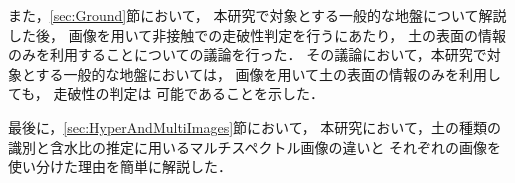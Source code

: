 また，\ref{sec:Ground}節において，
本研究で対象とする一般的な地盤について解説した後，
画像を用いて非接触での走破性判定を行うにあたり，
土の表面の情報のみを利用することについての議論を行った．
その議論において，本研究で対象とする一般的な地盤においては，
画像を用いて土の表面の情報のみを利用しても，
走破性の判定は
可能であることを示した．

最後に，\ref{sec:HyperAndMultiImages}節において，
本研究において，土の種類の識別と含水比の推定に用いるマルチスペクトル画像の違いと
それぞれの画像を使い分けた理由を簡単に解説した．

\newpage

